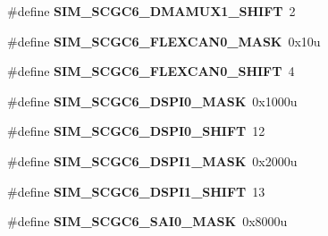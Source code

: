 \begin{DoxyCompactItemize}
\item 
\hypertarget{group___s_i_m___register___masks_gaaeb956e01b814ddc61c0655e3c56027e}{}\#define {\bfseries S\+I\+M\+\_\+\+S\+C\+G\+C6\+\_\+\+D\+M\+A\+M\+U\+X1\+\_\+\+S\+H\+I\+F\+T}~2\label{group___s_i_m___register___masks_gaaeb956e01b814ddc61c0655e3c56027e}

\item 
\hypertarget{group___s_i_m___register___masks_ga62d67e6ac8f6b99c2d456be532b31a52}{}\#define {\bfseries S\+I\+M\+\_\+\+S\+C\+G\+C6\+\_\+\+F\+L\+E\+X\+C\+A\+N0\+\_\+\+M\+A\+S\+K}~0x10u\label{group___s_i_m___register___masks_ga62d67e6ac8f6b99c2d456be532b31a52}

\item 
\hypertarget{group___s_i_m___register___masks_gade95a67c98499139b322e706b4ce3db1}{}\#define {\bfseries S\+I\+M\+\_\+\+S\+C\+G\+C6\+\_\+\+F\+L\+E\+X\+C\+A\+N0\+\_\+\+S\+H\+I\+F\+T}~4\label{group___s_i_m___register___masks_gade95a67c98499139b322e706b4ce3db1}

\item 
\hypertarget{group___s_i_m___register___masks_ga40d160456ac3673946a6baeffd9f702c}{}\#define {\bfseries S\+I\+M\+\_\+\+S\+C\+G\+C6\+\_\+\+D\+S\+P\+I0\+\_\+\+M\+A\+S\+K}~0x1000u\label{group___s_i_m___register___masks_ga40d160456ac3673946a6baeffd9f702c}

\item 
\hypertarget{group___s_i_m___register___masks_gaba377a9df07ad4b39fbc1b717df86370}{}\#define {\bfseries S\+I\+M\+\_\+\+S\+C\+G\+C6\+\_\+\+D\+S\+P\+I0\+\_\+\+S\+H\+I\+F\+T}~12\label{group___s_i_m___register___masks_gaba377a9df07ad4b39fbc1b717df86370}

\item 
\hypertarget{group___s_i_m___register___masks_ga731c4c0e575f2723d7bddfd4d331e6ea}{}\#define {\bfseries S\+I\+M\+\_\+\+S\+C\+G\+C6\+\_\+\+D\+S\+P\+I1\+\_\+\+M\+A\+S\+K}~0x2000u\label{group___s_i_m___register___masks_ga731c4c0e575f2723d7bddfd4d331e6ea}

\item 
\hypertarget{group___s_i_m___register___masks_ga23a3ce5fd7a40d100742e140022318f3}{}\#define {\bfseries S\+I\+M\+\_\+\+S\+C\+G\+C6\+\_\+\+D\+S\+P\+I1\+\_\+\+S\+H\+I\+F\+T}~13\label{group___s_i_m___register___masks_ga23a3ce5fd7a40d100742e140022318f3}

\item 
\hypertarget{group___s_i_m___register___masks_ga497edf79557dcc396d2e83f999ab3400}{}\#define {\bfseries S\+I\+M\+\_\+\+S\+C\+G\+C6\+\_\+\+S\+A\+I0\+\_\+\+M\+A\+S\+K}~0x8000u\label{group___s_i_m___register___masks_ga497edf79557dcc396d2e83f999ab3400}


\end{DoxyCompactItemize}
